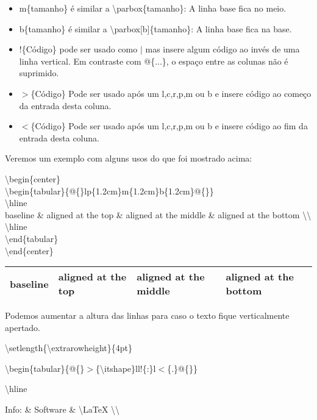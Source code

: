 \begin{itemize}
	\item m\{tamanho\} é similar a \textbackslash parbox\{tamanho\}: A linha base fica no meio.
	\item b\{tamanho\} é similar a \textbackslash parbox[b]\{tamanho\}: A linha base fica na base.
	\item !\{Código\} pode ser usado como $|$ mas insere algum código ao
		invés de uma linha vertical. Em contraste com @\{...\}, o
		espaço entre as colunas não é suprimido.
	\item $>$\{Código\} Pode ser usado após um l,c,r,p,m ou b e insere
		código ao começo da entrada desta coluna.
	\item $<$\{Código\} Pode ser usado após um l,c,r,p,m ou b e insere
		código ao fim da entrada desta coluna.
\end{itemize}

Veremos um exemplo com alguns usos do que foi mostrado acima:

\noindent\textbackslash begin\{center\}\\
\textbackslash begin\{tabular\}\{@\{\}lp\{1.2cm\}m\{1.2cm\}b\{1.2cm\}@\{\}\}\\
	\textbackslash hline\\
	baseline \& aligned at the top \& aligned at the middle \& aligned at the bottom \textbackslash \textbackslash \\
	\textbackslash hline\\
\textbackslash end\{tabular\}\\
\textbackslash end\{center\}\\

\begin{center}
\begin{tabular}{@{}lp{1.2cm}m{1.2cm}b{1.2cm}@{}}
	\hline
	baseline & aligned at the top & aligned at the middle & aligned at the bottom \\
	\hline
\end{tabular}
\end{center}

Podemos aumentar a altura das linhas para caso o texto fique verticalmente apertado.

\ttfamily
\indent\textbackslash setlength\{\textbackslash extrarowheight\}\{4pt\}

\textbackslash begin\{tabular\}\{@\{\}$>$\{\textbackslash itshape\}ll!\{:\}l$<$\{.\}@\{\}\}

	\textbackslash hline

	Info: \& Software \& \textbackslash LaTeX \textbackslash \textbackslash 

